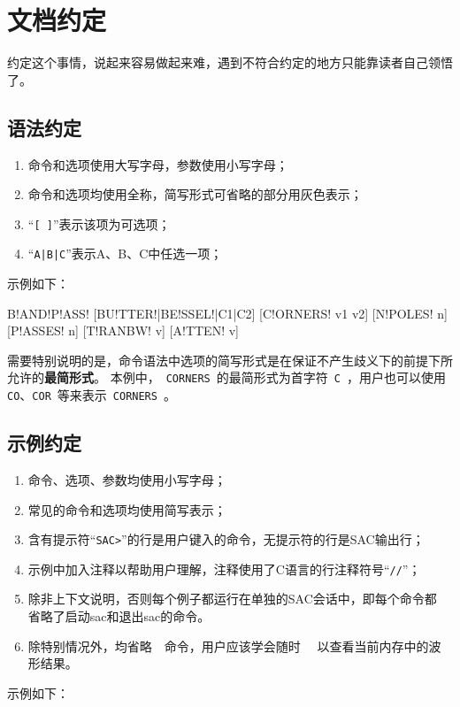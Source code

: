 \section{文档约定}
约定这个事情，说起来容易做起来难，遇到不符合约定的地方只能靠读者自己领悟了。

\subsection*{语法约定}
\begin{enumerate}
\item 命令和选项使用大写字母，参数使用小写字母；
\item 命令和选项均使用全称，简写形式可省略的部分用灰色表示；
\item ``\verb+[ ]+''表示该项为可选项；
\item ``\verb+A|B|C+''表示A、B、C中任选一项；
\end{enumerate}

示例如下：
\begin{SACSTX}
B!AND!P!ASS! [BU!TTER!|BE!SSEL!|C1|C2] [C!ORNERS! v1 v2] [N!POLES! n] [P!ASSES! n] 
    [T!RANBW! v] [A!TTEN! v]
\end{SACSTX}

需要特别说明的是，命令语法中选项的简写形式是在保证不产生歧义下的前提下所允许的\textbf{最简形式}。
本例中，~\verb+CORNERS+~的最简形式为首字符~\verb+C+~，用户也可以使用
\verb+CO+、\verb+COR+~等来表示~\verb+CORNERS+~。

\subsection*{示例约定}
\begin{enumerate}
\item 命令、选项、参数均使用小写字母；
\item 常见的命令和选项均使用简写表示；
\item 含有提示符``\verb+SAC>+''的行是用户键入的命令，无提示符的行是SAC输出行；
\item 示例中加入注释以帮助用户理解，注释使用了C语言的行注释符号``\verb+//+''；
\item 除非上下文说明，否则每个例子都运行在单独的SAC会话中，即每个命令都
    省略了启动sac和退出sac的命令。
\item 除特别情况外，均省略~~命令，用户应该学会随时~~
    以查看当前内存中的波形结果。
\end{enumerate}

示例如下：
